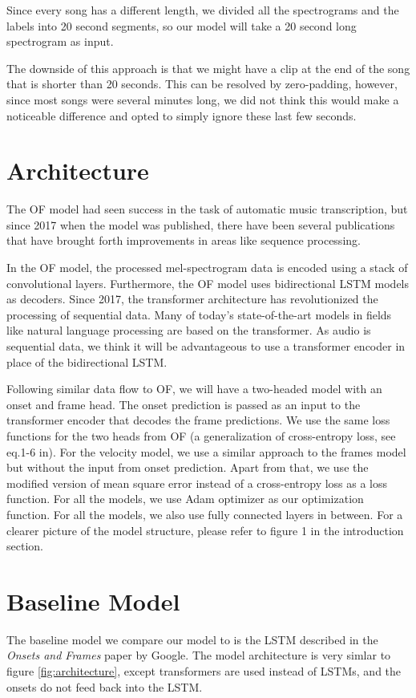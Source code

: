 \documentclass[a4paper,twocolumn,10pt]{article}
\begin{document}
Since every song has a different length, we divided all the spectrograms and the labels into 20 second segments, so our model will take a 20 second long spectrogram as input.

The downside of this approach is that we might have a clip at the end of the song that is shorter than 20 seconds. This can be resolved by zero-padding, however, since most songs were several minutes long, we did not think this would make a noticeable difference and opted to simply ignore these last few seconds.
\section{Architecture}
The OF model\cite{onsets_and_frames} had seen success in the task of automatic music transcription, but since 2017 when the model was published, there have been several publications that have brought forth improvements in areas like sequence processing.

In the OF model, the processed mel-spectrogram data is encoded using a stack of convolutional layers\cite{rainer}. Furthermore, the OF model uses bidirectional LSTM models as decoders. Since 2017, the transformer architecture has revolutionized the processing of sequential data\cite{attention}. Many of today’s state-of-the-art models in fields like natural language processing are based on the transformer. As audio is sequential data, we think it will be advantageous to use a transformer encoder in place of the bidirectional LSTM.

Following similar data flow to OF, we will have a two-headed model with an onset and frame head. The onset prediction is passed as an input to the transformer encoder that decodes the frame predictions. We use the same loss functions for the two heads from OF (a generalization of cross-entropy loss, see eq.1-6 in\cite{onsets_and_frames}). For the velocity model, we use a similar approach to the frames model but without the input from onset prediction. Apart from that, we use the modified version of mean square error instead of a cross-entropy loss as a loss function. For all the models, we use Adam optimizer as our optimization function.  For all the models, we also use fully connected layers in between. For a clearer picture of the model structure, please refer to figure 1 in the introduction section.

\section{Baseline Model}
The baseline model we compare our model to is the LSTM described in the \textit{Onsets and Frames} paper by Google\cite{onsets_and_frames}. The model architecture is very simlar to figure \ref{fig:architecture}, except transformers are used instead of LSTMs, and the onsets do not feed back into the LSTM.
\end{document}
